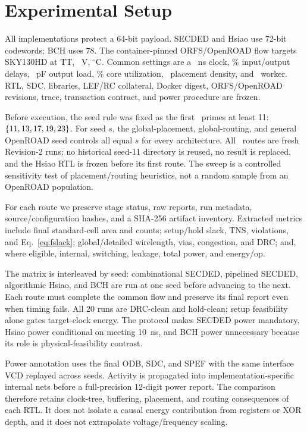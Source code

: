 \section{Experimental Setup}

All implementations protect a 64-bit payload. SECDED and Hsiao use 72-bit codewords; BCH uses 78. The container-pinned ORFS/OpenROAD flow targets SKY130HD at TT, \VoltageV~V, \TemperatureC$^{\circ}$C. Common settings are a \ClockPeriodNs~ns clock, \IODelayPercent\% input/output delays, \OutputLoadPf~pF output load, \CoreUtilPercent\% core utilization, \PlaceDensity\ placement density, and \WorkerCount\ worker. RTL, SDC, libraries, LEF/RC collateral, Docker digest, ORFS/OpenROAD revisions, trace, transaction contract, and power procedure are frozen.

Before execution, the seed rule was fixed as the first \SeedCount\ primes at least 11: $\{11,13,17,19,23\}$. For seed $s$, the global-placement, global-routing, and general OpenROAD seed controls all equal $s$ for every architecture. All \ValidRoutes\ routes are fresh Revision-2 runs; no historical seed-11 directory is reused, no result is replaced, and the Hsiao RTL is frozen before its first route. The sweep is a controlled sensitivity test of placement/routing heuristics, not a random sample from an OpenROAD population.

For each route we preserve stage status, raw reports, run metadata, source/configuration hashes, and a SHA-256 artifact inventory. Extracted metrics include final standard-cell area and counts; setup/hold slack, TNS, violations, and Eq.~\eqref{eq:fslack}; global/detailed wirelength, vias, congestion, and DRC; and, where eligible, internal, switching, leakage, total power, and energy/op.

The matrix is interleaved by seed: combinational SECDED, pipelined SECDED, algorithmic Hsiao, and BCH are run at one seed before advancing to the next. Each route must complete the common flow and preserve its final report even when timing fails. All 20 runs are DRC-clean and hold-clean; setup feasibility alone gates target-clock energy. The protocol makes SECDED power mandatory, Hsiao power conditional on meeting 10~ns, and BCH power unnecessary because its role is physical-feasibility contrast.

Power annotation uses the final ODB, SDC, and SPEF with the same interface VCD replayed across seeds. Activity is propagated into implementation-specific internal nets before a full-precision 12-digit power report. The comparison therefore retains clock-tree, buffering, placement, and routing consequences of each RTL. It does not isolate a causal energy contribution from registers or XOR depth, and it does not extrapolate voltage/frequency scaling.
